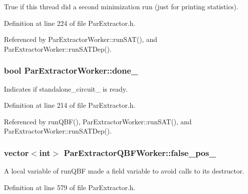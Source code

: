 True if this thread did a second minimization run (just for printing statistics). 



Definition at line 224 of file Par\-Extractor.\-h.



Referenced by Par\-Extractor\-Worker\-::run\-S\-A\-T(), and Par\-Extractor\-Worker\-::run\-S\-A\-T\-Dep().

\hypertarget{classParExtractorWorker_a460487c299f8c86e745a940278d38ee0}{
\subsubsection[{done\-\_\-}]{\setlength{\rightskip}{0pt plus 5cm}bool Par\-Extractor\-Worker\-::done\-\_\-\hspace{0.3cm}{\ttfamily [inherited]}}}\label{classParExtractorWorker_a460487c299f8c86e745a940278d38ee0}


Indicates if standalone\-\_\-circuit\-\_\- is ready. 



Definition at line 214 of file Par\-Extractor.\-h.



Referenced by run\-Q\-B\-F(), Par\-Extractor\-Worker\-::run\-S\-A\-T(), and Par\-Extractor\-Worker\-::run\-S\-A\-T\-Dep().

\hypertarget{classParExtractorQBFWorker_a447ecd3d7dcc60fa2ccfa738443d1f08}{
\subsubsection[{false\-\_\-pos\-\_\-}]{\setlength{\rightskip}{0pt plus 5cm}vector$<$int$>$ Par\-Extractor\-Q\-B\-F\-Worker\-::false\-\_\-pos\-\_\-\hspace{0.3cm}{\ttfamily [protected]}}}\label{classParExtractorQBFWorker_a447ecd3d7dcc60fa2ccfa738443d1f08}


A local variable of run\-Q\-B\-F made a field variable to avoid calls to its destructor. 



Definition at line 579 of file Par\-Extractor.\-h.



